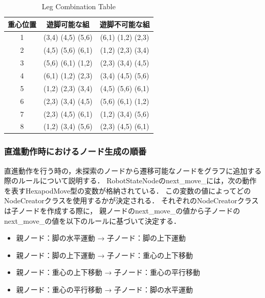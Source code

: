 \begin{table}[h]
  \caption{Leg Combination Table}
  \label{tab:leg_combination_table}  %
  \begin{center}
    \begin{tabular}{|c|c|c|} \hline  %
      重心位置 & 遊脚可能な組 & 遊脚不可能な組  \\ \hline  %
      1 & (3,4) (4,5) (5,6) & (6,1) (1,2) (2,3) \\ \hline  %
      2 & (4,5) (5,6) (6,1) & (1,2) (2,3) (3,4) \\ \hline  %
      3 & (5,6) (6,1) (1,2) & (2,3) (3,4) (4,5) \\ \hline  %
      4 & (6,1) (1,2) (2,3) & (3,4) (4,5) (5,6) \\ \hline  %
      5 & (1,2) (2,3) (3,4) & (4,5) (5,6) (6,1) \\ \hline  %
      6 & (2,3) (3,4) (4,5) & (5,6) (6,1) (1,2) \\ \hline  %
      7 & (2,3) (4,5) (6,1) & (1,2) (3,4) (5,6) \\ \hline  %
      8 & (1,2) (3,4) (5,6) & (2,3) (4,5) (6,1) \\ \hline  %
    \end{tabular}
  \end{center}
\end{table}

\subsubsection{直進動作時におけるノード生成の順番}
直進動作を行う時の，未探索のノードから遷移可能なノードをグラフに追加する際のルールについて説明する．
RobotStateNodeのnext\_move\_には，次の動作を表すHexapodMove型の変数が格納されている．
この変数の値によってどのNodeCreatorクラスを使用するかが決定される．
それぞれのNodeCreatorクラスは子ノードを作成する際に，
親ノードのnext\_move\_の値から子ノードのnext\_move\_の値を以下のルールに基づいて決定する．

\begin{itemize}
  \item 親ノード：脚の水平運動 → 子ノード：脚の上下運動
  \item 親ノード：脚の上下運動 → 子ノード：重心の上下移動
  \item 親ノード：重心の上下移動 → 子ノード：重心の平行移動
  \item 親ノード：重心の平行移動 → 子ノード：脚の水平運動
\end{itemize}

